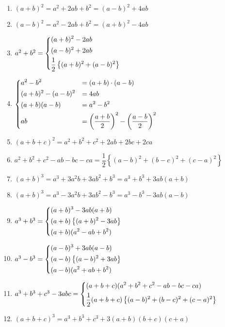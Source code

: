 \documentclass[12pt,a4paper,twoside]{book}
\begin{document}
\begin{enumerate}
	\item $(a+b)^2= a^2+2ab+b^2 = (a-b)^2+4ab$
	\item $(a-b)^2= a^2-2ab+b^2 = (a+b)^2-4ab$
	\item $a^2+b^2= \begin{dcases}
		(a+b)^2-2ab & \\
		(a-b)^2+2ab & \\
		\dfrac{1}{2}\left\{ (a+b)^2+(a-b)^2\right\} & \\
	\end{dcases}$
	\item $\begin{dcases}
		a^2-b^2 &=  (a+b)\cdot(a-b) \\
		(a+b)^2-(a-b)^2 &= 4ab \\
		(a+b)(a-b) &= a^2-b^2 \\
		ab &= \left(\dfrac{a+b}{2}\right)^2- \left(\dfrac{a-b}{2}\right)^2\\
	\end{dcases}$
	\item $(a+b+c)^2=a^2+b^2+c^2+2ab+2bc+2ca$
	\item $a^2+b^2+c^2-ab-bc-ca= \dfrac{1}{2} \left\{(a-b)^2+(b-c)^2+(c-a)^2\right\}$
	\item $(a+b)^3=a^3+3a^2b+3ab^2+b^3 = a^3+b^3+3ab(a+b)$
	\item $(a+b)^3=a^3-3a^2b+3ab^2-b^3 = a^3-b^3-3ab(a-b)$
	\item $a^3+b^3= \begin{dcases}
		(a+b)^3-3ab(a+b) & \\
		(a+b)\left\{(a+b)^2-3ab\right\}& \\
		(a+b)(a^2-ab+b^2) &\\
	\end{dcases}$
	\item $a^3-b^3= \begin{dcases}
		(a-b)^3+3ab(a-b) & \\
		(a-b)\left\{(a-b)^2+3ab\right\}& \\
		(a-b)(a^2+ab+b^2) &\\
	\end{dcases}$
	\item $a^3+b^3+c^3-3abc = \begin{dcases}
		(a+b+c)(a^2+b^2+c^2-ab-bc-ca) &\\
		\dfrac{1}{2}(a+b+c)\left\{(a-b)^2+(b-c)^2+(c-a)^2\right\}
	\end{dcases}$
	\item $(a+b+c)^3=a^3+b^3+c^3+3(a+b)(b+c)(c+a)$
\end{enumerate}
\end{document}
